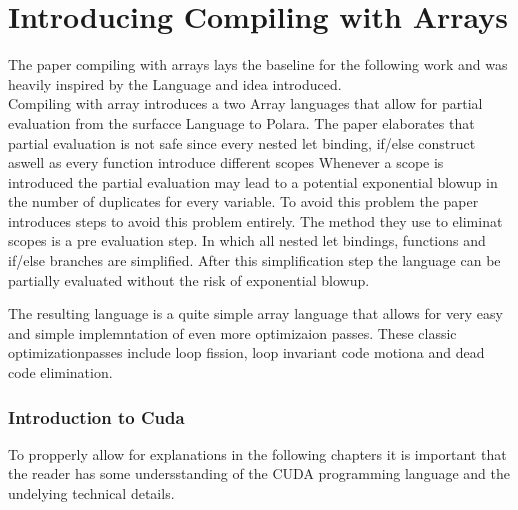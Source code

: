 \chapter{Introducing Compiling with Arrays}
The paper compiling with arrays lays the baseline for the following work and was heavily inspired by the Language and idea introduced.\\
Compiling with array introduces a two Array languages that allow for partial evaluation from the surfacce Language to Polara.
The paper elaborates that partial evaluation is not safe since every nested let binding, if/else construct aswell as every function introduce different scopes
Whenever a scope is introduced the partial evaluation may lead to a potential exponential blowup in the number of duplicates for every variable.
To avoid this problem the paper introduces steps to avoid this problem entirely.
The method they use to eliminat scopes is a pre evaluation step. In which all nested
let bindings, functions and if/else branches are simplified.
After this simplification step the language can be partially evaluated without the
risk of exponential blowup.

The resulting language is a quite simple array language that allows for very easy and simple implemntation of even more optimizaion passes.
These classic optimizationpasses include loop fission, loop invariant code motiona and dead code elimination.

\subsection{Introduction to Cuda}
To propperly allow for explanations in the following chapters it is important that the reader has some undersstanding of the CUDA programming language and the  undelying technical details.
